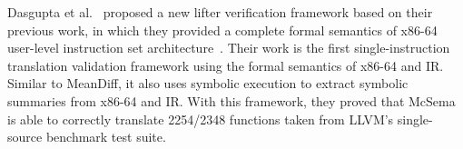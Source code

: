 Dasgupta et al.~\cite{dasgupta2020scalable} proposed a new lifter verification framework based on their previous work, in which they provided a complete formal semantics of x86-64 user-level instruction set architecture~\cite{dasgupta2019complete}. Their work is the first single-instruction translation validation framework using the formal semantics of x86-64 and IR. Similar to MeanDiff, it also uses symbolic execution to extract symbolic summaries from x86-64 and IR. With this framework, they proved that McSema is able to correctly translate 2254/2348 functions taken from LLVM's single-source benchmark test suite.
